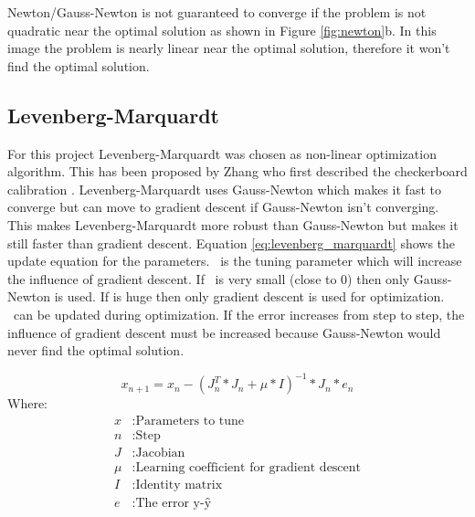 \documentclass[11pt,a4paper,titlepage,oneside]{report}
\begin{document}
Newton/Gauss-Newton is not guaranteed to converge if the problem is not quadratic near the optimal solution as shown in Figure \ref{fig:newton}b. In this image the problem is nearly linear near the optimal solution, therefore it won't find the optimal solution.

\subsection{Levenberg-Marquardt}
For this project Levenberg-Marquardt was chosen as non-linear optimization algorithm. This has been proposed by Zhang who first described the checkerboard calibration \cite{Zhang}. Levenberg-Marquardt uses Gauss-Newton which makes it fast to converge but can move to gradient descent if Gauss-Newton isn't converging. This makes Levenberg-Marquardt more robust than Gauss-Newton but makes it still faster than gradient descent. Equation \ref{eq:levenberg_marquardt} shows the update equation for the parameters. \mu\ is the tuning parameter which will increase the influence of gradient descent. If \mu\ is very small (close to 0) then only Gauss-Newton is used. If \mu is huge then only gradient descent is used for optimization. \mu\ can be updated during optimization. If the error increases from step to step, the influence of gradient descent must be increased because Gauss-Newton would never find the optimal solution.

\begin{equation}\label{eq:levenberg_marquardt}
  x_{n+1} = x_n - (J_n^T*J_n + \mu*I)^{-1}*J_n*e_n
\end{equation}
Where:
\begin{align*}
  x		  &: \text{Parameters to tune}\\
  n		  &: \text{Step}\\
  J		  &: \text{Jacobian}\\
  \mu	  &: \text{Learning coefficient for gradient descent}\\
  I     &: \text{Identity matrix}\\
  e  	  &: \text{The error y-ŷ}
\end{align*}
\end{document}
